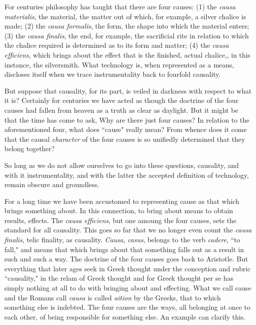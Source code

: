 For centuries philosophy has taught that there are four causes: (1) the \textit{causa materialis}, the material, the matter out of which, for example, a silver chalice is made; (2) the \textit{causa formalis}, the form, the shape into which the material enters; (3) the \textit{causa finalis}, the end, for example, the sacrificial rite in relation to which the chalice required is determined as to its form and matter; (4) the \textit{causa efficiens}, which brings about the effect that is the finished, actual chalice,, in this instance, the silversmith. What technology is, when represented as a means, discloses itself when we trace instrumentality back to fourfold causality.

But suppose that causality, for its part, is veiled in darkness with respect to what it is? Certainly for centuries we have acted as though the doctrine of the four causes had fallen from heaven as a truth as clear as daylight. But it might be that the time has come to ask, Why are there just four causes? In relation to the aforementioned four, what does ``cause" really mean? From whence does it come that the causal \textit{character} of the four causes is so unifiedly determined that they belong together?

So long as we do not allow ourselves to go into these questions, causality, and with it instrumentality, and with the latter the accepted definition of technology, remain obscure and groundless.

For a long time we have been accustomed to representing cause as that which brings something about. In this connection, to bring about means to obtain results, effects. The \textit{causa efficiens}, but one amoung the four causes, sets the standard for all causality. This goes so far that we no longer even count the \textit{causa finalis}, telic finality, as causality. \textit{Causa}, \textit{casus}, belongs to the verb \textit{cadere}, ``to fall," and means that which brings about that something falls out as a result in such and such a way. The doctrine of the four causes goes back to Aristotle. But everything that later ages seek in Greek thought under the conception and rubric ``causality," in the relam of Greek thought and for Greek thought per se has simply nothing at all to do with bringing about and effecting. What we call cause and the Romans call \textit{causa} is called \textit{aition} by the Greeks, that to which something else is indebted. The four causes are the ways, all belonging at once to each other, of being responsible for something else. An example can clarify this.

